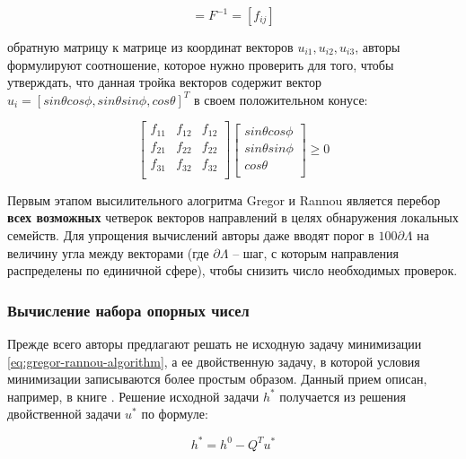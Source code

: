 \documentclass[a4paper, 12pt, titlepage]{article}
\theoremstyle{definition}
\theoremstyle{plain}
\theoremstyle{plain}
\begin{document}
\begin{equation}
 [u_{i_{1}}, u_{i_{2}}, u_{i_{3}}] = F^{-1} = [f_{ij}]
\end{equation}

обратную матрицу к матрице из координат векторов $u_{i{1}}, u_{i{2}}, u_{i{3}}$,
авторы формулируют соотношение, которое нужно проверить для того, чтобы 
утверждать, что данная тройка векторов содержит вектор
$u_{i} = [sin \theta cos \phi, sin \theta sin \phi, cos \theta]^{T}$
в своем положительном конусе:

\begin{equation}
 \left[
 \begin{array}{ccc}
  f_{11} & f_{12} & f_{12} \\
  f_{21} & f_{22} & f_{22} \\
  f_{31} & f_{32} & f_{32} \\
 \end{array}
 \right]
 \left[
 \begin{array}{c}
  sin \theta cos \phi \\
  sin \theta sin \phi \\
  cos \theta \\
 \end{array}
 \right] \geq 0
\end{equation}

Первым этапом высилительного алогритма Gregor и Rannou является перебор
\textbf{всех возможных} четверок векторов направлений в целях обнаружения
локальных семейств. Для упрощения вычислений авторы даже вводят порог в
$100 \partial \Lambda$ на величину угла между векторами (где
$\partial \Lambda$ -- шаг, с которым направления распределены по единичной 
сфере), чтобы снизить число необходимых проверок.

\subsubsection{Вычисление набора опорных чисел}

Прежде всего авторы предлагают решать не исходную задачу минимизации
\ref{eq:gregor-rannou-algorithm}, а ее двойственную задачу, в которой условия
минимизации записываются более простым образом. Данный прием описан, например, в
книге \cite{books/BertsekasT1989}. Решение исходной задачи $h^{*}$ получается из
решения двойственной задачи $u^{*}$ по формуле:

\begin{equation}
 h^{*} = h^{0} - Q^{T} u^{*}
\end{equation}
\end{document}
